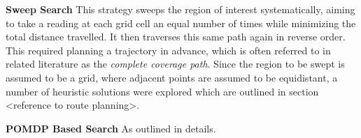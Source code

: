 
\textbf{Sweep Search}
This strategy sweeps the region of interest systematically, aiming to take a reading at each grid cell an equal number of times while minimizing the total distance travelled. It then traverses this same path again in reverse order. This required planning a trajectory in advance, which is often referred to in related literature as the \textit{complete coverage path}. Since the region to be swept is assumed to be a grid, where adjacent points are assumed to be equidistant, a number of heuristic solutions were explored which are outlined in section <reference to route planning>.\par

\textbf{POMDP Based Search} 
As outlined in 
details. \par